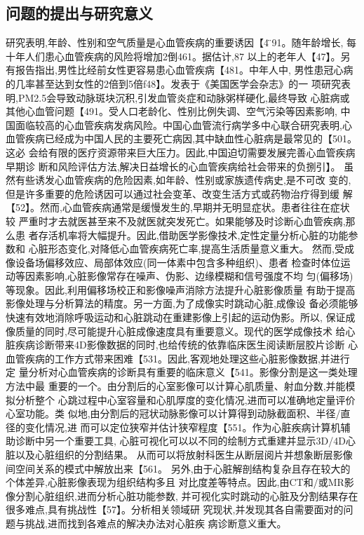 \subsection{问题的提出与研究意义}
研究表明,年龄、性别和空气质量是心血管疾病的重要诱因【4 ̈91。随年龄增长,
每十年人们患心血管疾病的风险将增加2倒461。据估计,87%
以上的老年人【47】。另有报告指出,男性比经前女性更容易患心血管疾病【481。中年人中,
男性患冠心病的几率甚至达到女性的2倍到5倍f48】。发表于《美国医学会杂志》的一
项研究表明,PM2.5会导致动脉斑块沉积,引发血管炎症和动脉粥样硬化,最终导致
心脏病或其他心血管问题【491。受人口老龄化、性别比例失调、空气污染等因素影响,
中国面临较高的心血管疾病发病风险。中国心血管流行病学多中心联合研究表明,心
血管疾病已经成为中国人民的主要死亡病因,其中缺血性心脏病是最常见的【501。这必
会给有限的医疗资源带来巨大压力。因此,中国迫切需要发展完善心血管疾病早期诊
断和风险评估方法,解决日益增长的心血管疾病给社会带来的负捌引】。
虽然有些诱发心血管疾病的危险因素,如年龄、性别或家族遗传病史,是不可改
变的,但是许多重要的危险诱因可以通过社会变革、改变生活方式或药物治疗得到缓
解【52】。然而,心血管疾病通常是缓慢发生的,早期并无明显症状。患者往往在症状较
严重时才去就医甚至来不及就医就突发死亡。如果能够及时诊断心血管疾病,那么患
者存活机率将大幅提升。因此,借助医学影像技术,定性定量分析心脏的功能参数和
心脏形态变化,对降低心血管疾病死亡率,提高生活质量意义重大。
然而,受成像设备场偏移效应、局部体效应(同一体素中包含多种组织)、患者
检查时体位运动等因素影响,心脏影像常存在噪声、伪影、边缘模糊和信号强度不均
匀(偏移场)等现象。因此,利用偏移场校正和影像噪声消除方法提升心脏影像质量
有助于提高影像处理与分析算法的精度。另一方面,为了成像实时跳动心脏,成像设
备必须能够快速有效地消除呼吸运动和心脏跳动在重建影像上引起的运动伪影。所以,
保证成像质量的同时,尽可能提升心脏成像速度具有重要意义。现代的医学成像技术
给心脏疾病诊断带来4D影像数据的同时,也给传统的依靠临床医生阅读断层胶片诊断
心血管疾病的工作方式带来困难【531。因此,客观地处理这些心脏影像数据,并进行定
量分析对心血管疾病的诊断具有重要的临床意义【541。影像分割是这一类处理方法中最
重要的一个。由分割后的心室影像可以计算心肌质量、射血分数,并能模拟分析整个
心跳过程中心室容量和心肌厚度的变化情况,进而可以准确地定量评价心室功能。类
似地,由分割后的冠状动脉影像可以计算得到动脉截面积、半径/直径的变化情况,进
而可以定位狭窄并估计狭窄程度【551。作为心脏疾病计算机辅助诊断中另一个重要工具,
心脏可视化可以以不同的绘制方式重建并显示3D/4D心脏以及心脏组织的分割结果。
从而可以将放射科医生从断层阅片并想象断层影像间空间关系的模式中解放出来【561。
另外,由于心脏解剖结构复杂且存在较大的个体差异,心脏影像表现为组织结构多且
对比度差等特点。因此,由CT和/或MR影像分割心脏组织,进而分析心脏功能参数,
并可视化实时跳动的心脏及分割结果存在很多难点,具有挑战性【57】。分析相关领域研
究现状,并发现其各自需要面对的问题与挑战,进而找到各难点的解决办法对心脏疾
病诊断意义重大。


